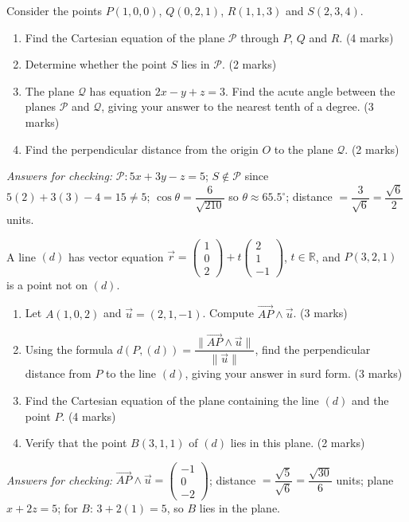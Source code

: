 \documentclass[11pt]{article}
\begin{document}
\begin{exercice}
Consider the points $P(1, 0, 0)$, $Q(0, 2, 1)$, $R(1, 1, 3)$ and $S(2, 3, 4)$.
\begin{enumerate}
\item Find the Cartesian equation of the plane $\mathcal{P}$ through $P$, $Q$ and $R$. \hfill (4 marks)
\item Determine whether the point $S$ lies in $\mathcal{P}$. \hfill (2 marks)
\item The plane $\mathcal{Q}$ has equation $2x - y + z = 3$. Find the acute angle between the planes $\mathcal{P}$ and $\mathcal{Q}$, giving your answer to the nearest tenth of a degree. \hfill (3 marks)
\item Find the perpendicular distance from the origin $O$ to the plane $\mathcal{Q}$. \hfill (2 marks)
\end{enumerate}
\emph{Answers for checking:} $\mathcal{P}: 5x + 3y - z = 5$; $S \notin \mathcal{P}$ since $5(2) + 3(3) - 4 = 15 \neq 5$; $\cos\theta = \dfrac{6}{\sqrt{210}}$ so $\theta \approx 65.5^{\circ}$; distance $= \dfrac{3}{\sqrt{6}} = \dfrac{\sqrt{6}}{2}$ units.
\end{exercice}

\begin{exercice}
A line $(d)$ has vector equation $\vec{r} = \begin{pmatrix} 1 \\ 0 \\ 2 \end{pmatrix} + t \begin{pmatrix} 2 \\ 1 \\ -1 \end{pmatrix}$, $t \in \mathbb{R}$, and $P(3, 2, 1)$ is a point not on $(d)$.
\begin{enumerate}
\item Let $A(1, 0, 2)$ and $\vec{u} = (2, 1, -1)$. Compute $\vec{AP} \wedge \vec{u}$. \hfill (3 marks)
\item Using the formula $d(P, (d)) = \dfrac{\|\vec{AP} \wedge \vec{u}\|}{\|\vec{u}\|}$, find the perpendicular distance from $P$ to the line $(d)$, giving your answer in surd form. \hfill (3 marks)
\item Find the Cartesian equation of the plane containing the line $(d)$ and the point $P$. \hfill (4 marks)
\item Verify that the point $B(3, 1, 1)$ of $(d)$ lies in this plane. \hfill (2 marks)
\end{enumerate}
\emph{Answers for checking:} $\vec{AP} \wedge \vec{u} = \begin{pmatrix} -1 \\ 0 \\ -2 \end{pmatrix}$; distance $= \dfrac{\sqrt{5}}{\sqrt{6}} = \dfrac{\sqrt{30}}{6}$ units; plane $x + 2z = 5$; for $B$: $3 + 2(1) = 5$, so $B$ lies in the plane.
\end{exercice}
\end{document}
